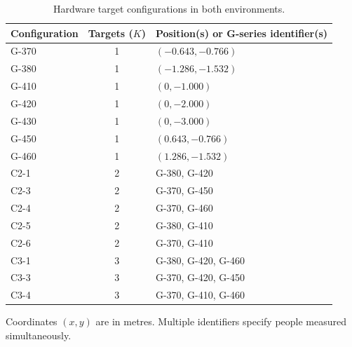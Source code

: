 \begin{table}[t]
\centering
\caption{Hardware target configurations in both environments.}
\label{tab:configurations}
\footnotesize
\setlength{\tabcolsep}{3pt}
\begin{tabular}{lcl}
\hline
Configuration & Targets ($K$) & Position(s) or G-series identifier(s) \\
\hline
G-370 & 1 & $(-0.643,-0.766)$ \\
G-380 & 1 & $(-1.286,-1.532)$ \\
G-410 & 1 & $(0,-1.000)$ \\
G-420 & 1 & $(0,-2.000)$ \\
G-430 & 1 & $(0,-3.000)$ \\
G-450 & 1 & $(0.643,-0.766)$ \\
G-460 & 1 & $(1.286,-1.532)$ \\
C2-1 & 2 & G-380, G-420 \\
C2-3 & 2 & G-370, G-450 \\
C2-4 & 2 & G-370, G-460 \\
C2-5 & 2 & G-380, G-410 \\
C2-6 & 2 & G-370, G-410 \\
C3-1 & 3 & G-380, G-420, G-460 \\
C3-3 & 3 & G-370, G-420, G-450 \\
C3-4 & 3 & G-370, G-410, G-460 \\
\hline
\end{tabular}
\par\smallskip\parbox{.98\linewidth}{\scriptsize Coordinates $(x,y)$ are in metres. Multiple identifiers specify people measured simultaneously.}
\end{table}
